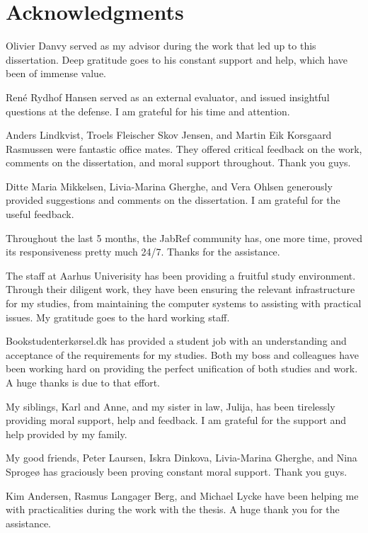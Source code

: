 \documentclass[twoside,11pt,openright,a4paper]{report}
\begin{document}
\chapter*{Acknowledgments}

Olivier Danvy served as my advisor during the work that led up to this
dissertation.  Deep gratitude goes to his constant support and help,
which have been of immense value.

René Rydhof Hansen served as an external evaluator, and issued
insightful questions at the defense.  I am grateful for his time and attention.

Anders Lindkvist, Troels Fleischer Skov Jensen, and Martin Eik
Korsgaard Rasmussen were fantastic office mates.  They offered
critical feedback on the work, comments on the dissertation, and moral
support throughout.  Thank you guys.

Ditte Maria Mikkelsen, Livia-Marina Gherghe, and Vera Ohlsen
generously provided suggestions and comments on the dissertation.
I am grateful for the useful feedback.

Throughout the last 5 months, the JabRef community has, one more time,
proved its responsiveness pretty much 24/7.  Thanks for the
assistance.

The staff at Aarhus Univerisity has been providing a fruitful study
environment.  Through their diligent work, they have been ensuring the
relevant infrastructure for my studies, from maintaining the computer
systems to assisting with practical issues.  My gratitude goes to the
hard working staff.

Bookstudenterkørsel.dk has provided a student job with an
understanding and acceptance of the requirements for my studies.  Both
my boss and colleagues have been working hard on providing the perfect
unification of both studies and work.  A huge thanks is due to that
effort.

My siblings, Karl and Anne, and my sister in law, Julija, has been
tirelessly providing moral support, help and feedback.  I am grateful
for the support and help provided by my family.

My good friends, Peter Laursen, Iskra Dinkova, Livia-Marina Gherghe,
and Nina Sprogeø has graciously been proving constant moral support.
Thank you guys.

Kim Andersen, Rasmus Langager Berg, and Michael Lycke have been
helping me with practicalities during the work with the thesis.  A
huge thank you for the assistance.
\end{document}
